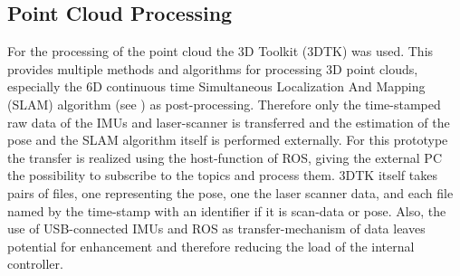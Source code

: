 \subsection{Point Cloud Processing}                                                                                                                                                                                  
\label{sec:TechnicalApproach:pointcloudprocessing}
For the processing of the point cloud the 3D Toolkit (3DTK) was used.
This provides multiple methods and algorithms for processing 3D point clouds, especially the 6D continuous time Simultaneous Localization And Mapping (SLAM) algorithm (see \cite{3DARCH2017_1, LS2019}) as post-processing.
Therefore only the time-stamped raw data of the IMUs and laser-scanner is transferred and the estimation of the pose and the SLAM algorithm itself is performed externally.
For this prototype the transfer is realized using the host-function of ROS, giving the external PC the possibility to subscribe to the topics and process them.
3DTK itself takes pairs of files, one representing the pose, one the laser scanner data, and each file named by the time-stamp with an identifier if it is scan-data or pose.
Also, the use of USB-connected IMUs and ROS as transfer-mechanism of data leaves potential for enhancement and therefore reducing the load of the internal controller.